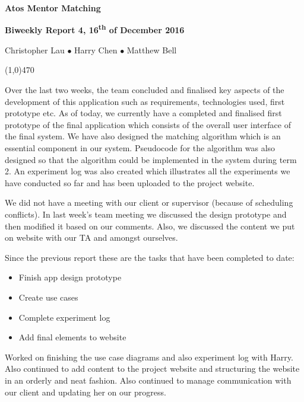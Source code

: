 \documentclass[11pt]{report}
\begin{document}
\centerline{{\LARGE \bf Atos Mentor Matching}}

\centerline{\large \bf Biweekly Report 4, 16\textsuperscript{th} of December 2016}
\centerline{Christopher Lau $\bullet$ Harry Chen $\bullet$ Matthew Bell }
\noindent
\line(1,0){470}\\


\smallskip

\noindent
Over the last two weeks, the team concluded and finalised key aspects of the
development of this application such as requirements, technologies used, first
prototype etc. As of today, we currently have a completed and finalised first
prototype of the final application which consists of the overall user interface
of the final system. We have also designed the matching algorithm which is an
essential component in our system. Pseudocode for the algorithm was also
designed so that the algorithm could be implemented in the system during term 2.
An experiment log was also created which illustrates all the experiments we have
conducted so far and has been uploaded to the project website.

\bigskip
{}
\smallskip

\noindent
We did not have a meeting with our client or supervisor (because of scheduling
conflicts). In last week’s team meeting we discussed the design prototype and
then modified it based on our comments. Also, we discussed the content we put on
website with our TA and amongst ourselves.

\bigskip
{}
\smallskip

\noindent
Since the previous report these are the tasks that have been completed to date:
\begin{itemize}
    \item Finish app design prototype
    \item Create use cases
    \item Complete experiment log
    \item Add final elements to website
\end{itemize}

\bigskip
{}
\smallskip

\noindent
Worked on finishing the use case diagrams and also experiment log with Harry.
Also continued to add content to the project website and structuring the website
in an orderly and neat fashion. Also continued to manage communication with our
client and updating her on our progress.
\end{document}
